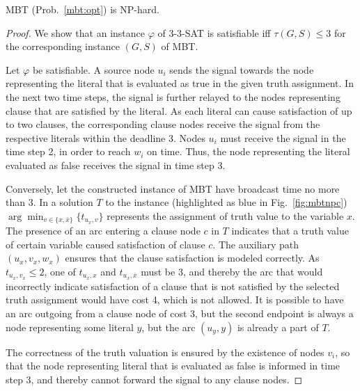 \begin{proposition}\label{lemma:mbtred}
	MBT (Prob.~\ref{mbt:opt}) is NP-hard.
\end{proposition}
\begin{proof}\label{prop:mbtnpc}
We show that an instance $\varphi$ of \textsc{3-3-SAT} is satisfiable iff $\tau(G,S)\leq 3$ for the corresponding instance $(G,S)$ of MBT.

Let $\varphi$ be satisfiable.
A source node $u_i$ sends the signal towards the node representing the literal that is evaluated as true in the given truth assignment.
In the next two time steps, the signal is further relayed to the nodes representing clause that are satisfied by the literal.
As each literal can cause satisfaction of up to two clauses, the corresponding clause nodes receive the signal from the respective literals within the deadline 3.
Nodes $u_i$ must receive the signal in the time step 2, in order to reach $w_i$ on time.
Thus, the node representing the literal evaluated as false receives the signal in time step 3.

Conversely, let the constructed instance of MBT have broadcast time no more than 3.
In a solution $T$ to the instance (highlighted as blue in Fig.~\ref{fig:mbtnpc})  $\arg\min_{v\in\{x,\bar{x}\}}\{t_{u_x,v}\}$ represents the assignment of truth value to the variable $x$.
The presence of an arc entering a clause node $c$ in $T$ indicates that a truth value of certain variable caused satisfaction of clause $c$.
The auxiliary path $(u_x,v_x,w_x)$ ensures that the clause satisfaction is modeled correctly.
As $t_{u_x,v_x}\leq 2$, one of $t_{u_x,x}$ and $t_{u_x,\bar{x}}$ must be 3, 
and thereby the arc that would incorrectly indicate satisfaction of a clause that is not satisfied by the selected truth assignment would have cost 4, which is not allowed.
It is possible to have an arc outgoing from a clause node of cost 3, but the second endpoint is always a node representing some literal $y$, but the arc $(u_y,y)$ is already a part of $T$.

The correctness of the truth valuation is ensured by the existence of nodes $v_i$, so that the node representing literal that is evaluated as false is informed in time step 3, 
and thereby cannot forward the signal to any clause nodes.
\end{proof}

